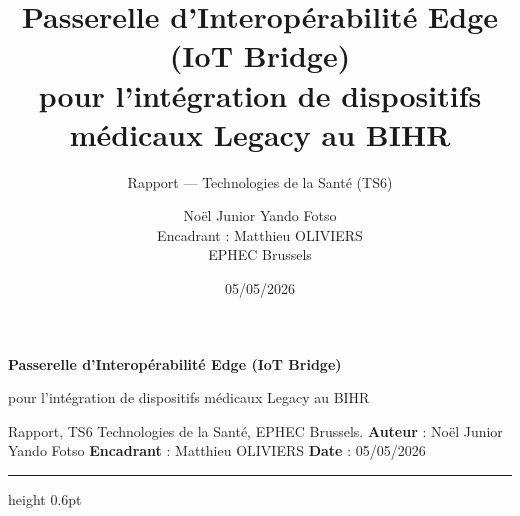 \documentclass[10pt,a4paper,french,twoside=false,open=any]{scrreprt}
\title{Passerelle d'Interop\'erabilit\'e Edge (IoT Bridge)\\
       pour l'int\'egration de dispositifs m\'edicaux Legacy au BIHR}
\subtitle{Rapport --- Technologies de la Sant\'e (TS6)}
\author{No\"el Junior Yando Fotso\\
        \small Encadrant : Matthieu OLIVIERS\\
        \small EPHEC Brussels}
\date{05/05/2026}
\begin{document}
\noindent
{\color{bridgeblue}\LARGE\bfseries Passerelle d'Interop\'erabilit\'e Edge (IoT Bridge)}\par
\vspace{2pt}
{\color{bridgeteal}\large pour l'int\'egration de dispositifs m\'edicaux Legacy au BIHR}\par
\vspace{6pt}
{\small Rapport, TS6 Technologies de la Sant\'e, EPHEC Brussels.\quad
 \textbf{Auteur} : No\"el Junior Yando Fotso \quad
 \textbf{Encadrant} : Matthieu OLIVIERS \quad
 \textbf{Date} : 05/05/2026}\par
\vspace{0.4em}\hrule height 0.6pt\vspace{0.6em}













\printbibliography
\end{document}
